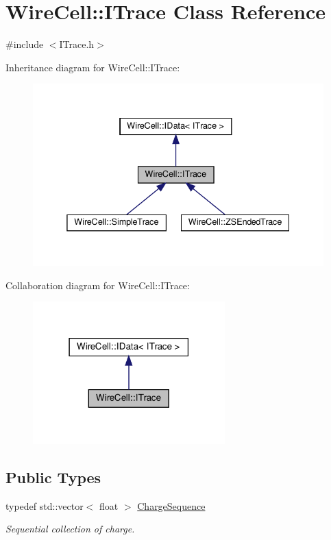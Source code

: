 \hypertarget{class_wire_cell_1_1_i_trace}{}\section{Wire\+Cell\+:\+:I\+Trace Class Reference}
\label{class_wire_cell_1_1_i_trace}


{\ttfamily \#include $<$I\+Trace.\+h$>$}



Inheritance diagram for Wire\+Cell\+:\+:I\+Trace\+:
\nopagebreak
\begin{figure}[H]
\begin{center}
\leavevmode
\includegraphics[width=338pt]{class_wire_cell_1_1_i_trace__inherit__graph}
\end{center}
\end{figure}


Collaboration diagram for Wire\+Cell\+:\+:I\+Trace\+:
\nopagebreak
\begin{figure}[H]
\begin{center}
\leavevmode
\includegraphics[width=210pt]{class_wire_cell_1_1_i_trace__coll__graph}
\end{center}
\end{figure}
\subsection*{Public Types}
\begin{DoxyCompactItemize}
\item 
typedef std\+::vector$<$ float $>$ \hyperlink{class_wire_cell_1_1_i_trace_a3dab103257bc46bfd486966f69836954}{Charge\+Sequence}
\begin{DoxyCompactList}\small\item\em Sequential collection of charge. \end{DoxyCompactList}\end{DoxyCompactItemize}
